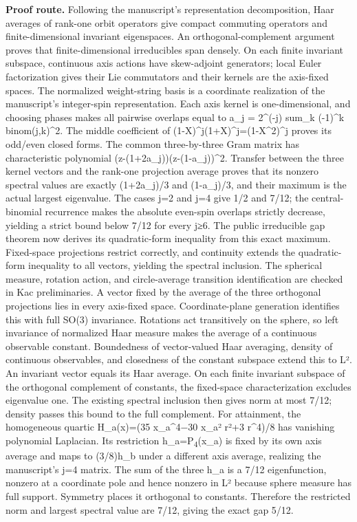 \textbf{Proof route.} Following the manuscript's representation decomposition, Haar averages of rank-one orbit operators give compact commuting operators and finite-dimensional invariant eigenspaces. An orthogonal-complement argument proves that finite-dimensional irreducibles span densely. On each finite invariant subspace, continuous axis actions have skew-adjoint generators; local Euler factorization gives their Lie commutators and their kernels are the axis-fixed spaces. The normalized weight-string basis is a coordinate realization of the manuscript's integer-spin representation. Each axis kernel is one-dimensional, and choosing phases makes all pairwise overlaps equal to a\_j = 2\textasciicircum{}(-j) sum\_k (-1)\textasciicircum{}k binom(j,k)\textasciicircum{}2. The middle coefficient of (1-X)\textasciicircum{}j(1+X)\textasciicircum{}j=(1-X\textasciicircum{}2)\textasciicircum{}j proves its odd/even closed forms. The common three-by-three Gram matrix has characteristic polynomial (z-(1+2a\_j))(z-(1-a\_j))\textasciicircum{}2. Transfer between the three kernel vectors and the rank-one projection average proves that its nonzero spectral values are exactly (1+2a\_j)/3 and (1-a\_j)/3, and their maximum is the actual largest eigenvalue. The cases j=2 and j=4 give 1/2 and 7/12; the central-binomial recurrence makes the absolute even-spin overlaps strictly decrease, yielding a strict bound below 7/12 for every j≥6. The public irreducible gap theorem now derives its quadratic-form inequality from this exact maximum. Fixed-space projections restrict correctly, and continuity extends the quadratic-form inequality to all vectors, yielding the spectral inclusion. The spherical measure, rotation action, and circle-average transition identification are checked in Kac preliminaries. A vector fixed by the average of the three orthogonal projections lies in every axis-fixed space. Coordinate-plane generation identifies this with full SO(3) invariance. Rotations act transitively on the sphere, so left invariance of normalized Haar measure makes the average of a continuous observable constant. Boundedness of vector-valued Haar averaging, density of continuous observables, and closedness of the constant subspace extend this to L². An invariant vector equals its Haar average. On each finite invariant subspace of the orthogonal complement of constants, the fixed-space characterization excludes eigenvalue one. The existing spectral inclusion then gives norm at most 7/12; density passes this bound to the full complement. For attainment, the homogeneous quartic H\_a(x)=(35 x\_a\textasciicircum{}4−30 x\_a² r²+3 r\textasciicircum{}4)/8 has vanishing polynomial Laplacian. Its restriction h\_a=P\textsubscript{4}(x\_a) is fixed by its own axis average and maps to (3/8)h\_b under a different axis average, realizing the manuscript’s j=4 matrix. The sum of the three h\_a is a 7/12 eigenfunction, nonzero at a coordinate pole and hence nonzero in L² because sphere measure has full support. Symmetry places it orthogonal to constants. Therefore the restricted norm and largest spectral value are 7/12, giving the exact gap 5/12.

